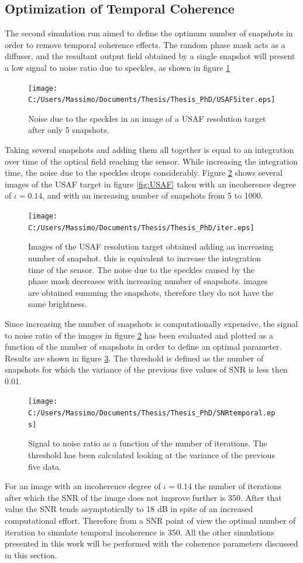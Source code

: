  \subsection{Optimization of Temporal Coherence}
The second simulation run aimed to define the optimum number of snapshots in order to remove temporal coherence effects. The random phase mask acts as a diffuser, and the resultant output field obtained by a single snapshot will present a low signal to noise ratio due to speckles, as shown in figure \ref{fig:speckle}
\begin{figure}[H]
	\centering
	\texttt{[image: C:/Users/Massimo/Documents/Thesis/Thesis\_PhD/USAF5iter.eps]}
	\caption{\label{fig:speckle}Noise due to the speckles in an image of a USAF resolution target after only 5 snapshots.}
\end{figure}
Taking several snapshots and adding them all together is equal to an integration over time of the optical field reaching the sensor. While increasing the integration time, the noise due to the speckles drops considerably. Figure \ref{fig:iter} shows several images of the USAF target in figure \ref{fig:USAF} taken with an incoherence degree of $\iota=0.14$, and with an increasing number of snapshots from 5 to 1000.
 \begin{figure}[H]
 	\centering
 	\texttt{[image: C:/Users/Massimo/Documents/Thesis/Thesis\_PhD/iter.eps]}
 	\caption{\label{fig:iter}Images of the USAF resolution target obtained adding an increasing number of snapshot. this is equivalent to increase the integration time of the sensor. The noise due to the speckles caused by the phase mask decreases with increasing number of snapshots. images are obtained summing the snapshots, therefore they do not have the same brightness.}
 \end{figure}
 Since increasing the number of snapshots is computationally expensive, the signal to noise ratio of the images in figure \ref{fig:iter} has been evaluated and plotted as a function of the number of snapshots in order to define an optimal parameter. Results are shown in figure \ref{fig:SNRiter}. The threshold is defined as the number of snapshots for which the variance of the previous five values of SNR is less then 0.01.
 \begin{figure}[H]
 	\centering
 	\texttt{[image: C:/Users/Massimo/Documents/Thesis/Thesis\_PhD/SNRtemporal.eps]}
 	\caption{\label{fig:SNRiter}Signal to noise ratio as a function of the number of iterations. The threshold has been calculated looking at the variance of the previous five data.}
 \end{figure}
 For an image with an incoherence degree of $\iota=0.14$ the number of iterations after which the SNR of the image does not improve further is 350. After that value the SNR tends asymptotically to 18 dB in spite of an increased computational effort. Therefore from a SNR point of view the optimal number of iteration to simulate temporal incoherence is 350. All the other simulations presented in this work will be performed with the coherence parameters discussed in this section. 
